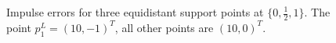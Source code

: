 \begin{figure}[h!]
\caption{Impulse errors for three equidistant support points at $\{0,\frac{1}{2},1\}$. The point $p_1^L=(10,-1)^T$, all other points are $(10,0)^T$.}
\label{fig:equidist_3_alles_default_ausser_p1_10_-1}
\end{figure}

